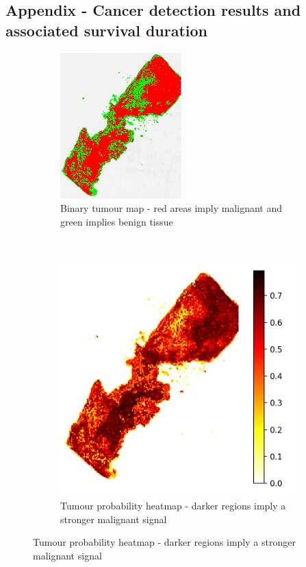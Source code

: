 \documentclass{l4proj}
\begin{document}
\begin{appendices}
\chapter{Appendix - Cancer detection results and associated survival duration} \label{apx:results}

\begin{figure}[h]
    \centering
    \begin{subfigure}[b]{0.4\textwidth}
        \includegraphics[scale=1]{images/appendix_b/TCGA-AC-A23H-mss.png}
        \caption{Binary tumour map - red areas imply malignant and green implies benign tissue}
    \end{subfigure}\hfill%
    ~~
    \begin{subfigure}[b]{0.4\textwidth}
        \includegraphics[scale=0.5]{images/appendix_b/TCGA-AC-A23H-mmi.png}
        \caption{Tumour probability heatmap - darker regions imply a stronger malignant signal}
    \end{subfigure}


\end{figure}
\end{appendices}
\end{document}
